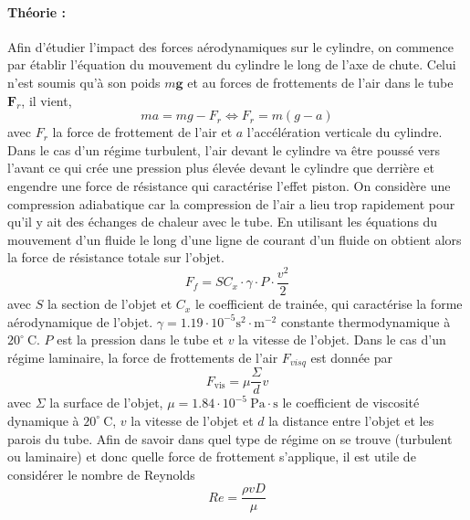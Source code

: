\documentclass[a4paper, 12pt,oneside]{article}
\begin{document}
\paragraph{Théorie : } Afin d'étudier l'impact des forces aérodynamiques sur le cylindre, on commence par établir l'équation du mouvement du cylindre le long de l'axe de chute. Celui n'est soumis qu'à son poids $m\boldsymbol{g}$ et au forces de frottements de l'air dans le tube $\boldsymbol{F}_r$, il vient, 
\begin{equation}
    ma = mg - F_r \iff F_r = m(g - a)
    \label{eq:Newton}
\end{equation} avec $F_r$ la force de frottement de l'air et $a$ l'accélération verticale du cylindre.
Dans le cas d'un régime turbulent, l'air devant le cylindre va être poussé vers l'avant ce qui crée une pression plus élevée devant le cylindre que derrière et engendre une force de résistance qui caractérise l'effet piston. On considère une compression adiabatique car la compression de l'air a lieu trop rapidement pour qu'il y ait des échanges de chaleur avec le tube. En utilisant les équations du mouvement d'un fluide le long d'une ligne de courant d'un fluide on obtient alors la force de résistance totale sur l'objet. 
\begin{equation}
    F_f = S C_x \cdot \gamma \cdot P \cdot \frac{v^2}{2}
    \label{eq:frottements_turbulent}
\end{equation} \cite{notice}
avec $S$ la section de l'objet et $C_x$ le coefficient de trainée, qui caractérise la forme aérodynamique de l'objet. $\gamma = 1.19\cdot10^{-5} \mathrm{s^2\cdot m^{-2}}$ constante thermodynamique à $20^\circ ~\mathrm{C}$. $P$ est la pression dans le tube et $v$ la vitesse de l'objet. 
Dans le cas d'un régime laminaire, la force de frottements de l'air $F_{visq}$ est donnée par 
\begin{equation}
    F_{\text{vis}} = \mu \frac{\Sigma}{d} v
    \label{eq:frottements_visqueux}
\end{equation} \cite{notice} avec $\Sigma$ la surface de l'objet, $\mu = 1.84\cdot10^{-5}~\mathrm{Pa\cdot s}$ le coefficient de viscosité dynamique à $20^\circ ~\mathrm{C}$, $v$ la vitesse de l'objet et $d$ la distance entre l'objet et les parois du tube. 
Afin de savoir dans quel type de régime on se trouve (turbulent ou laminaire) et donc quelle force de frottement s'applique, il est utile de considérer le nombre de Reynolds
\begin{equation}
    Re = \frac{\rho v D}{\mu}
    \label{eq:Reynolds} 
\end{equation}
\end{document}
